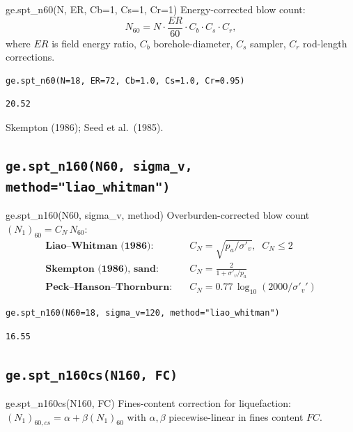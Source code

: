 \documentclass[11pt,a4paper,openany]{book}
\newcommand{\sigmavp}{\sigma'_v}
\begin{document}
\begin{funcbox}{ge.spt\_n60(N, ER, Cb=1, Cs=1, Cr=1)}
Energy-corrected blow count:
\[
N_{60} = N \cdot \frac{ER}{60} \cdot C_b \cdot C_s \cdot C_r,
\]
where $ER$ is field energy ratio, $C_b$ borehole-diameter, $C_s$
sampler, $C_r$ rod-length corrections.
\end{funcbox}

\begin{lstlisting}
ge.spt_n60(N=18, ER=72, Cb=1.0, Cs=1.0, Cr=0.95)
\end{lstlisting}
\begin{lstlisting}[style=output]
20.52
\end{lstlisting}

\begin{refbox}
Skempton (1986); Seed et al.\ (1985).
\end{refbox}

\subsection{\texttt{ge.spt\_n160(N60, sigma\_v, method="liao\_whitman")}}

\begin{funcbox}{ge.spt\_n160(N60, sigma\_v, method)}
Overburden-corrected blow count $(N_1)_{60} = C_N\,N_{60}$:
\begin{align*}
\textbf{Liao--Whitman (1986):}      & \quad C_N = \sqrt{p_a / \sigmavp},\;\; C_N \leq 2 \\
\textbf{Skempton (1986), sand:}     & \quad C_N = \tfrac{2}{1 + \sigmavp/p_a} \\
\textbf{Peck--Hanson--Thornburn:}   & \quad C_N = 0.77\,\log_{10}(2000/\sigmavp')
\end{align*}
\end{funcbox}

\begin{lstlisting}
ge.spt_n160(N60=18, sigma_v=120, method="liao_whitman")
\end{lstlisting}
\begin{lstlisting}[style=output]
16.55
\end{lstlisting}

\subsection{\texttt{ge.spt\_n160cs(N160, FC)}}

\begin{funcbox}{ge.spt\_n160cs(N160, FC)}
Fines-content correction for liquefaction:
$(N_1)_{60,cs} = \alpha + \beta(N_1)_{60}$
with $\alpha, \beta$ piecewise-linear in fines content $FC$.
\end{funcbox}
\end{document}
